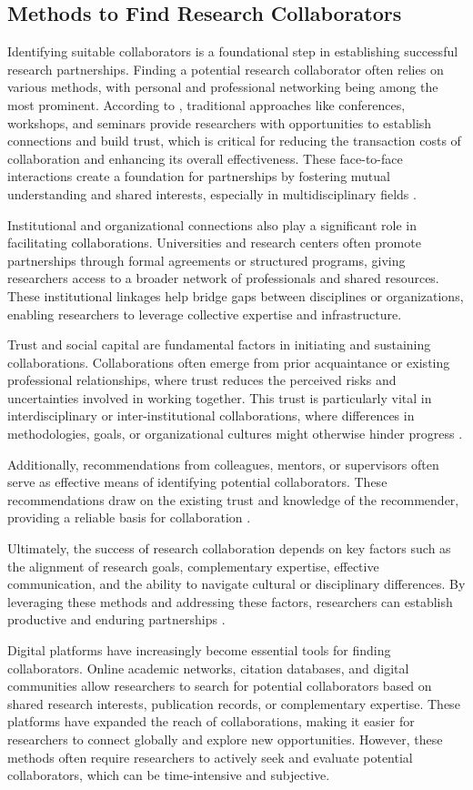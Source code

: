 \subsection*{Methods to Find Research Collaborators}
Identifying suitable collaborators is a foundational step in establishing successful research partnerships.
Finding a potential research collaborator often relies on various methods, with personal and professional networking being among the most prominent.
According to \textcite{KATZ19971}, traditional approaches like conferences, workshops, and seminars provide researchers with opportunities to establish connections and build trust, which is critical for reducing the transaction costs of collaboration and enhancing its overall effectiveness.
These face-to-face interactions create a foundation for partnerships by fostering mutual understanding and shared interests, especially in multidisciplinary fields \cite{Bozeman2014}.

Institutional and organizational connections also play a significant role in facilitating collaborations. Universities and research centers often promote partnerships through formal agreements or structured programs, giving researchers access to a broader network of professionals and shared resources. These institutional linkages help bridge gaps between disciplines or organizations, enabling researchers to leverage collective expertise and infrastructure.

Trust and social capital are fundamental factors in initiating and sustaining collaborations. Collaborations often emerge from prior acquaintance or existing professional relationships, where trust reduces the perceived risks and uncertainties involved in working together. This trust is particularly vital in interdisciplinary or inter-institutional collaborations, where differences in methodologies, goals, or organizational cultures might otherwise hinder progress \cite{Bozeman2014}.

Additionally, recommendations from colleagues, mentors, or supervisors often serve as effective means of identifying potential collaborators.
These recommendations draw on the existing trust and knowledge of the recommender, providing a reliable basis for collaboration \cite{Bozeman2014}.

Ultimately, the success of research collaboration depends on key factors such as the alignment of research goals, complementary expertise, effective communication, and the ability to navigate cultural or disciplinary differences.
By leveraging these methods and addressing these factors, researchers can establish productive and enduring partnerships \cite{Bozeman2014}.

Digital platforms have increasingly become essential tools for finding collaborators. Online academic networks, citation databases, and digital communities allow researchers to search for potential collaborators based on shared research interests, publication records, or complementary expertise. These platforms have expanded the reach of collaborations, making it easier for researchers to connect globally and explore new opportunities.
However, these methods often require researchers to actively seek and evaluate potential collaborators, which can be time-intensive and subjective.